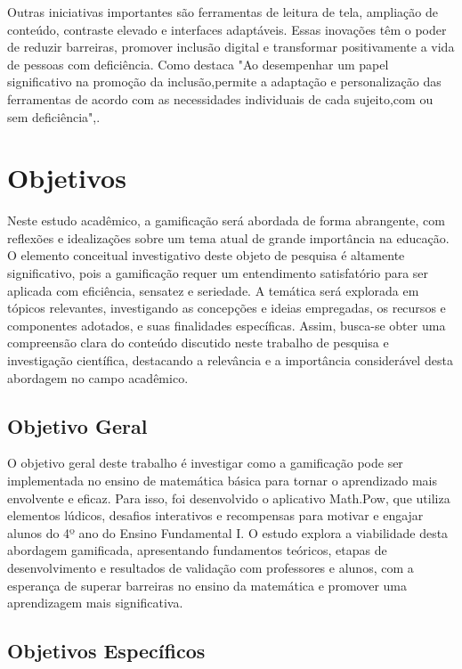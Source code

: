Outras iniciativas importantes são ferramentas de leitura de tela, ampliação de conteúdo, contraste elevado e interfaces adaptáveis. Essas inovações têm o poder de reduzir barreiras, promover inclusão digital e transformar positivamente a vida de pessoas com deficiência. Como destaca  \cite{cordeiro2023inclusao} "Ao desempenhar um papel significativo na promoção da inclusão,permite a adaptação e personalização das ferramentas de acordo com as necessidades individuais de cada sujeito,com ou sem deficiência",.


\section{Objetivos}

Neste estudo acadêmico, a gamificação será abordada de forma abrangente, com reflexões e idealizações sobre um tema atual de grande importância na educação. O elemento conceitual investigativo deste objeto de pesquisa é altamente significativo, pois a gamificação requer um entendimento satisfatório para ser aplicada com eficiência, sensatez e seriedade. A temática será explorada em tópicos relevantes, investigando as concepções e ideias empregadas, os recursos e componentes adotados, e suas finalidades específicas. Assim, busca-se obter uma compreensão clara do conteúdo discutido neste trabalho de pesquisa e investigação científica, destacando a relevância e a importância considerável desta abordagem no campo acadêmico.

\subsection{Objetivo Geral}

 O objetivo geral deste trabalho é investigar como a gamificação pode ser implementada no ensino de matemática básica para tornar o aprendizado mais envolvente e eficaz. Para isso, foi desenvolvido o aplicativo Math.Pow, que utiliza elementos lúdicos, desafios interativos e recompensas para motivar e engajar alunos do 4º ano do Ensino Fundamental I. O estudo explora a viabilidade desta abordagem gamificada, apresentando fundamentos teóricos, etapas de desenvolvimento e resultados de validação com professores e alunos, com a esperança de superar barreiras no ensino da matemática e promover uma aprendizagem mais significativa.
 
\subsection{Objetivos Específicos}

